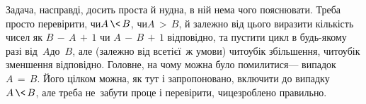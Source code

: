\Tutorial

Задача, насправді, досить проста й нудна, в ній нема чого пояснювати. Треба просто перевірити, 
чи\nolinebreak[2] ${A\,{\<}\,B}$,
чи\nolinebreak[2] ${A\,{>}\,B}$,
й залежно від цього виразити кількість чисел як 
${B\,{-}\,A\,{+}\,1}$ чи
${A\,{-}\,B\,{+}\,1}$ відповідно,
та пустити цикл 
в будь-якому разі від~$A$\nolinebreak[2] до~$B$,
але (залежно від все\nolinebreak[2] тієї~ж умови)
чи\nolinebreak[3] то\nolinebreak[2] у\nolinebreak[3] бік збільшення, 
чи\nolinebreak[3] то\nolinebreak[2] у\nolinebreak[3] бік зменшення відповідно.
Головне, на чому можна було помилитися\nolinebreak[3] --- випадок ${A\,{=}\,B}$.
Його цілком можна, як тут і запропоновано, включити до випадку ${A\,{\<}\,B}$,
але треба не~забути про\nolinebreak[3] це і перевірити, чи\nolinebreak[3] це\nolinebreak[2] зроблено правильно.
 
